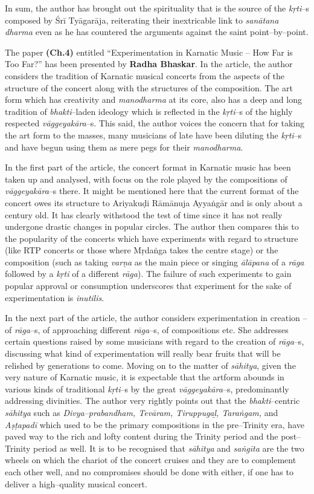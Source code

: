 In sum, the author has brought out the spirituality that is the source of the \textit{kṛti}–s composed by Śrī Tyāgarāja, reiterating their inextricable link to \textit{sanātana dharma} even as he has countered the arguments against the saint point–by–point.

The paper \textbf{(Ch.4)} entitled “Experimentation in Karnatic Music – How Far is Too Far?” has been presented by \textbf{Radha Bhaskar}. In the article, the author considers the tradition of Karnatic musical concerts from the aspects of the structure of the concert along with the structures of the composition. The art form which has creativity and \textit{manodharma} at its core, also has a deep and long tradition of \textit{bhakti}–laden ideology which is reflected in the \textit{kṛti}–s of the highly respected \textit{vāggeyakāra}–s. This said, the author voices the concern that for taking the art form to the masses, many musicians of late have been diluting the \textit{kṛti}–s and have begun using them as mere pegs for their \textit{manodharma}.

In the first part of the article, the concert format in Karnatic music has been taken up and analysed, with focus on the role played by the compositions of \textit{vāggeyakāra}–s there. It might be mentioned here that the current format of the concert owes its structure to Ariyakuḍi Rāmānuja Ayyaṅgār and is only about a century old. It has clearly withstood the test of time since it has not really undergone drastic changes in popular circles. The author then compares this to the popularity of the concerts which have experiments with regard to structure (like RTP concerts or those where Mṛdaṅga takes the centre stage) or the composition (such as taking \textit{varṇa} as the main piece or singing \textit{ālāpana} of a \textit{rāga} followed by a \textit{kṛti} of a different \textit{rāga}). The failure of such experiments to gain popular approval or consumption underscores that experiment for the sake of experimentation is \textit{inutilis}.

In the next part of the article, the author considers experimentation in creation – of \textit{rāga}–s, of approaching different \textit{rāga}–s, of compositions etc. She addresses certain questions raised by some musicians with regard to the creation of \textit{rāga}–s, discussing what kind of experimentation will really bear fruits that will be relished by generations to come. Moving on to the matter of \textit{sāhitya}, given the very nature of Karnatic music, it is expectable that the artform abounds in various kinds of traditional \textit{kṛti}–s by the great \textit{vāggeyakāra}–s, predominantly addressing divinities. The author very rightly points out that the \textit{bhakti}–centric \textit{sāhitya} such as \textit{Divya–prabandham, Tevāram, Tiruppugaḻ, Taraṅgam, }and\textit{ Aṣṭapadī} which used to be the primary compositions in the pre–Trinity era, have paved way to the rich and lofty content during the Trinity period and the post–Trinity period as well. It is to be recognised that \textit{sāhitya} and \textit{saṅgīta} are the two wheels on which the chariot of the concert cruises and they are to complement each other well, and no compromises should be done with either, if one has to deliver a high–quality musical concert.

